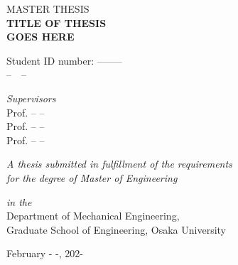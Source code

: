 
\begin{titlepage}
  \centering

{\Large MASTER THESIS} 
\vspace{1cm} \\
{\huge \textbf{TITLE OF THESIS\\GOES HERE}}\\ [0.5cm]
\vspace{5cm}

{\Large Student ID number: --------} 
\vspace{0.5cm} \\
{\LARGE --　--}

  

\textit{Supervisors} \vspace{0.1cm} \\
{\Large Prof. -- --} \\
{\Large Prof. -- --} \\
{\Large Prof. -- --} \\

\vspace{1cm}
\vfill

{\textit{A thesis submitted in fulfillment of the requirements}}\\
{\textit{for the degree of Master of Engineering}}\\
\vspace{0.3cm}

{\textit{in the}}\\


\vspace{0.3cm}
{\Large Department of Mechanical Engineering,}\\
{\Large Graduate School of Engineering, Osaka University}\\
\vspace{2.5cm}
  
 
  \vfill
  

    {\Large February - -, 202-}

   
  \vfill
  
 
   
  \end{titlepage}